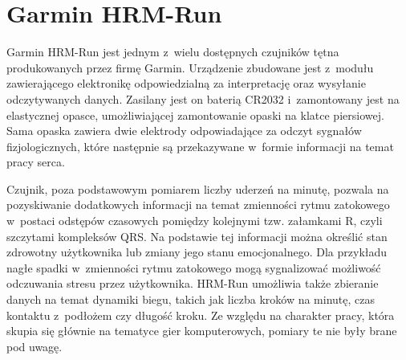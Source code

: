\section{Garmin HRM-Run}
Garmin HRM-Run jest jednym z~wielu dostępnych czujników tętna produkowanych przez firmę Garmin. Urządzenie zbudowane jest z~modułu zawierającego elektronikę odpowiedzialną za interpretację oraz wysyłanie odczytywanych danych. Zasilany jest on baterią CR2032 i~zamontowany jest na elastycznej opasce, umożliwiającej zamontowanie opaski na klatce piersiowej. Sama opaska zawiera dwie elektrody odpowiadające za odczyt sygnałów fizjologicznych, które następnie są przekazywane w~formie informacji na temat pracy serca. 

Czujnik, poza podstawowym pomiarem liczby uderzeń na minutę, pozwala na pozyskiwanie dodatkowych informacji na temat zmienności rytmu zatokowego w~postaci odstępów czasowych pomiędzy kolejnymi tzw. załamkami R, czyli szczytami kompleksów QRS. Na podstawie tej informacji można określić stan zdrowotny użytkownika lub zmiany jego stanu emocjonalnego. Dla przykładu nagłe spadki w~zmienności rytmu zatokowego mogą sygnalizować możliwość odczuwania stresu przez użytkownika. HRM-Run umożliwia także zbieranie danych na temat dynamiki biegu, takich jak liczba kroków na minutę, czas kontaktu z~podłożem czy długość kroku. Ze względu na charakter pracy, która skupia się głównie na tematyce gier komputerowych, pomiary te nie były brane pod uwagę. 

